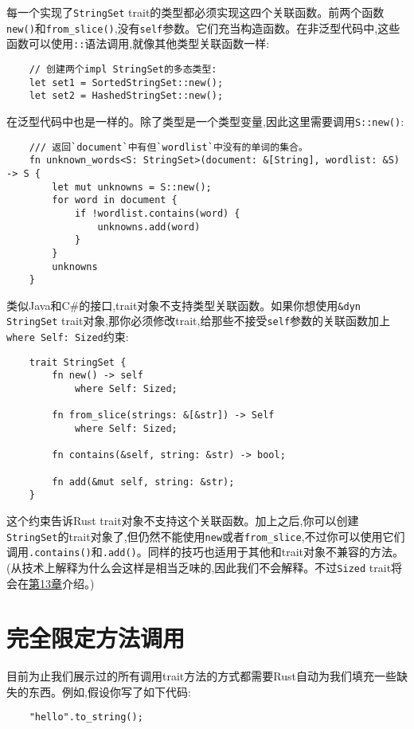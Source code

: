每一个实现了\texttt{StringSet} trait的类型都必须实现这四个关联函数。前两个函数\texttt{new()}和\texttt{from\_slice()},没有\texttt{self}参数。它们充当构造函数。在非泛型代码中,这些函数可以使用\texttt{::}语法调用,就像其他类型关联函数一样:
\begin{verbatim}
    // 创建两个impl StringSet的多态类型:
    let set1 = SortedStringSet::new();
    let set2 = HashedStringSet::new();
\end{verbatim}

在泛型代码中也是一样的。除了类型是一个类型变量,因此这里需要调用\texttt{S::new()}:
\begin{verbatim}
    /// 返回`document`中有但`wordlist`中没有的单词的集合。
    fn unknown_words<S: StringSet>(document: &[String], wordlist: &S) -> S {
        let mut unknowns = S::new();
        for word in document {
            if !wordlist.contains(word) {
                unknowns.add(word)
            }
        }
        unknowns
    }
\end{verbatim}

类似Java和C\#的接口,trait对象不支持类型关联函数。如果你想使用\texttt{\&dyn StringSet} trait对象,那你必须修改trait,给那些不接受\texttt{self}参数的关联函数加上\texttt{where Self: Sized}约束:

\begin{verbatim}
    trait StringSet {
        fn new() -> self
            where Self: Sized;

        fn from_slice(strings: &[&str]) -> Self
            where Self: Sized;

        fn contains(&self, string: &str) -> bool;

        fn add(&mut self, string: &str);
    }
\end{verbatim}

这个约束告诉Rust trait对象不支持这个关联函数。加上之后,你可以创建\texttt{StringSet}的trait对象了,但仍然不能使用\texttt{new}或者\texttt{from\_slice},不过你可以使用它们调用\texttt{.contains()}和\texttt{.add()}。同样的技巧也适用于其他和trait对象不兼容的方法。(从技术上解释为什么会这样是相当乏味的,因此我们不会解释。不过\texttt{Sized} trait将会在\hyperref[ch13]{第13章}介绍。)

\section{完全限定方法调用}\label{fullymethod}

目前为止我们展示过的所有调用trait方法的方式都需要Rust自动为我们填充一些缺失的东西。例如,假设你写了如下代码:
\begin{verbatim}
    "hello".to_string();
\end{verbatim}

